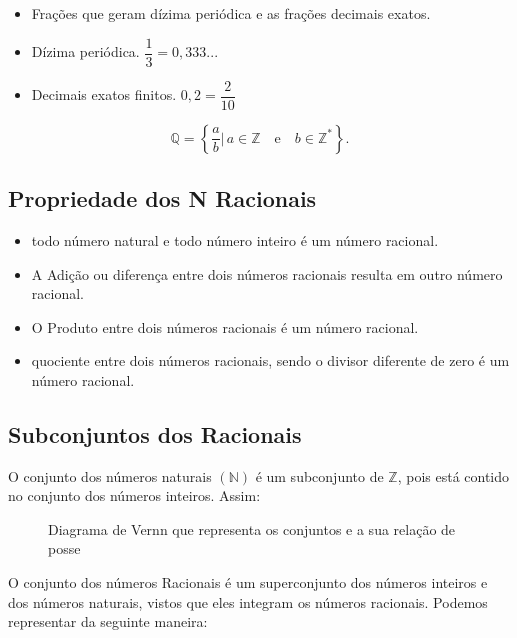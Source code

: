 \documentclass[letterpaper]{book}
\begin{document}
\begin{itemize}
\item Frações que geram dízima periódica e as frações decimais exatos.
\item Dízima periódica.  \(\dfrac{1}{3} = 0,333...\)
\item Decimais exatos finitos. \(0,2 = \dfrac{2}{10}\)
\end{itemize}

\[
{\displaystyle \mathbb {Q} =\left\{{\dfrac {a}{b}}|\,a\in \mathbb {Z} \quad {\mbox{e}}\quad b\in \mathbb {Z^{*}} \right\}.}
\]

\subsection{Propriedade dos N Racionais}

\begin{itemize}
\item todo número natural e todo número inteiro é um número racional.
\item A Adição ou diferença entre dois números racionais resulta em outro número racional.
\item O Produto entre dois números racionais é um número racional.
\item quociente entre dois números racionais, sendo o divisor diferente de zero é um número racional.
\end{itemize}

\subsection{Subconjuntos dos Racionais}

O conjunto dos números naturais \( (\mathbb{N}) \) é um subconjunto de \(\mathbb{Z}\), pois está contido no conjunto dos números inteiros. Assim:

\begin{figure}[H]
\centering
{}
\caption{Diagrama de Vernn que representa os conjuntos e a sua relação de posse}
\end{figure}

O conjunto dos números Racionais é um superconjunto dos números inteiros e dos números naturais, vistos que eles integram os números racionais. Podemos representar da seguinte maneira:
\end{document}
